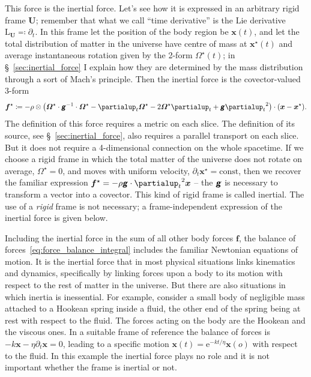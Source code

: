 \documentclass[\ifafour a4paper,12pt,\else a5paper,10pt,\fi%
onecolumn,oneside,article,%
british%
]{memoir}
\theoremstyle{remark}
\theoremstyle{innote}
\newcommand*{\mathte}[1]{\textbf{\textit{\textsf{#1}}}}
\newcommand*{\de}{\partialup}%
\newcommand*{\e}{\mathrm{e}}%
\newcommand*{\defd}{\coloneqq}
\newcommand*{\defs}{\eqqcolon}
\renewcommand*{\|}{\nonscript\,\vert\nonscript\;\mathopen{}}
\newcommand*{\sect}{\S}%
\newcommand*{\Li}{\mathrm{L}}
\newcommand*{\ydd}{\rho}
\newcommand*{\yd}{\ydd}
\newcommand*{\ybb}{f}
\newcommand*{\yb}{\bm{\ybb}}
\newcommand*{\ybi}{\yb^{\mathord{\star}}}
\newcommand*{\yxxt}{x}
\newcommand*{\yxt}{\bm{\yxxt}}
\newcommand*{\yxto}{\bm{\yxxt}^{\mathord{\star}}}
\newcommand*{\yomm}{\varOmega}
\newcommand*{\yom}{\bm{\yomm}^{\mathord{\star}}}
\newcommand*{\yFF}{U}
\newcommand*{\yF}{\bm{\yFF}}
\newcommand*{\ygg}{g}
\newcommand*{\yg}{\mathte{\ygg}}
\begin{document}
This force is the inertial force. Let's see how it is expressed in an
arbitrary rigid frame $\yF$; remember that what we call \enquote{time
  derivative} is the Lie derivative $\Li_{\yF} \defs \de_t$. In this frame
let the position of the body region be $\yxt(t)$, and let the total
distribution of matter in the universe have centre of mass at $\yxto(t)$
and average instantaneous rotation given by the 2-form $\yom(t)$; in
\sect~\ref{sec:inertial_force} I explain how they are determined by the
mass distribution through a sort of Mach's principle. Then the inertial
force is the covector-valued 3-form
\begin{equation}
  \label{eq:inertial_force}
  \ybi \defd  -\yd \otimes
  \bigl(\yom\cdot\yg^{-1}\cdot\yom  - \de_t\yom - 2\yom\de_t  + \yg{\de_t}^2\bigr)
  \cdot(\yxt-\yxto).
\end{equation}
The definition of this force requires a metric on each slice. The definition
of its source, see \sect~\ref{sec:inertial_force}, also requires a parallel
transport on each slice. But it does not require a 4-dimensional connection
on the whole spacetime. If we choose a rigid frame in which the total
matter of the universe does not rotate on average, $\yom=0$, and moves with
uniform velocity, $\de_t\yxto=\text{const}$, then we recover the familiar
expression $\ybi = -\yd \yg\cdot{\de_t}^2\yxt$ -- the $\yg$ is necessary to
transform a vector into a covector. This kind of rigid frame is called
inertial. The use of a \emph{rigid} frame is not necessary; a
frame-independent expression of the inertial force is given below.

Including the inertial force in the sum of all other body forces $\yb$, the
balance of forces~\eqref{eq:force_balance_integral} includes the familiar
Newtonian equations of motion. It is the inertial force that in most
physical situations links kinematics and dynamics, specifically by linking
forces upon a body to its motion with respect to the rest of matter in the
universe. But there are also situations in which inertia is inessential.
For example, consider a small body of negligible mass attached to a Hookean
spring inside a fluid, the other end of the spring being at rest with
respect to the fluid. The forces acting on the body are the Hookean and the
viscous ones. In a suitable frame of reference the balance of forces is
$-k\yxt - \eta\de_t\yxt = 0$, leading to a specific motion
$\yxt(t) = \e^{-kt/\eta}\yxt(o)$ with respect to the fluid. In this example
the inertial force plays no role and it is not important whether the frame
is inertial or not.
\end{document}
